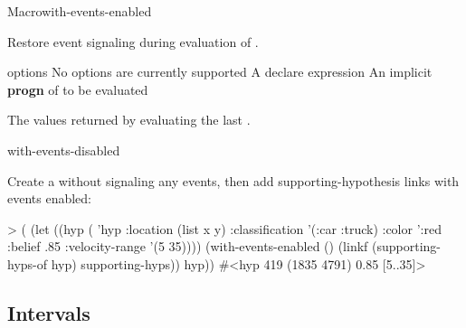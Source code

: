 \documentclass[10pt,twoside,english,pdftex]{article}
\begin{document}
\begin{functiondoc}{Macro}{with-events-enabled}%
  {\code{(}\superstar{}\code{)}
    \superstar{}
    \superstar{}
    \returns{} \superstar}
%
%
  
\fnsyntax

\fnpurpose Restore event signaling during evaluation of .

\fnpackage {}

\fnmodule {}

\fnargs
\begin{args}{options}
\arg[option] No options are currently supported
\arg[declaration] A declare expression
\arg[forms] An implicit \textbf{progn} of  to be evaluated
\end{args}

\fnreturns The values returned by evaluating the last .

\begin{alsos}{with-events-disabled}
\end{alsos}

\fnexample
{}%
Create a  without signaling any events, then add
supporting-hypothesis links with events enabled:
%
\W\supp
\begin{example}
> (
     (let ((hyp ( 'hyp 
                   :location (list x y)
                   :classification '(:car :truck)
                   :color ':red
                   :belief .85
                   :velocity-range '(5 35))))
        (with-events-enabled ()
           (linkf (supporting-hyps-of hyp) supporting-hyps))
        hyp))
#<hyp 419 (1835 4791) 0.85 [5..35]>
\end{example}

\end{functiondoc}


\T\markright{}%
\T\pagestyle{plain}
\T\clearpage
\W{}
\T\pagestyle{fancy}
\T\thispagestyle{fancybottom}
\T\global\def\fnlastname{ }%

\subsection{Intervals}
\label{sec:interval}%
\end{document}
